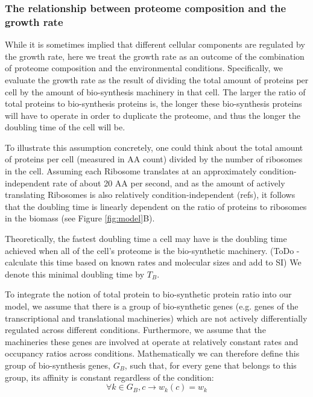 \documentclass[notitlepage]{article}
\begin{document}
\subsubsection{The relationship between proteome composition and the growth rate}
While it is sometimes implied that different cellular components are regulated by the growth rate, here we treat the growth rate as an outcome of the combination of proteome composition and the environmental conditions.
Specifically, we evaluate the growth rate as the result of dividing the total amount of proteins per cell by the amount of bio-synthesis machinery in that cell.
The larger the ratio of total proteins to bio-synthesis proteins is, the longer these bio-synthesis proteins will have to operate in order to duplicate the proteome, and thus the longer the doubling time of the cell will be.

To illustrate this assumption concretely, one could think about the total amount of proteins per cell (measured in AA count) divided by the number of ribosomes in the cell.
Assuming each Ribosome translates at an approximately condition-independent rate of about 20 AA per second, and as the amount of actively translating Ribosomes is also relatively condition-independent (refs), it follows that the doubling time is linearly dependent on the ratio of proteins to ribosomes in the biomass (see Figure \ref{fig:model}B).

Theoretically, the fastest doubling time a cell may have is the doubling time achieved when all of the cell's proteome is the bio-synthetic machinery.
(ToDo - calculate this time based on known rates and molecular sizes and add to SI)
We denote this minimal doubling time by $T_B$.

To integrate the notion of total protein to bio-synthetic protein ratio into our model, we assume that there is a group of bio-synthetic genes (e.g. genes of the transcriptional and translational machineries) which are not actively differentially regulated across different conditions.
Furthermore, we assume that the machineries these genes are involved at operate at relatively constant rates and occupancy ratios across conditions.
Mathematically we can therefore define this group of bio-synthesis genes, $G_B$, such that, for every gene that belongs to this group, its affinity is constant regardless of the condition:
\begin{equation}
  \label{eq:biosynth-def}
  \forall k \in G_B, c \rightarrow w_k(c)=w_k
\end{equation}
\end{document}
